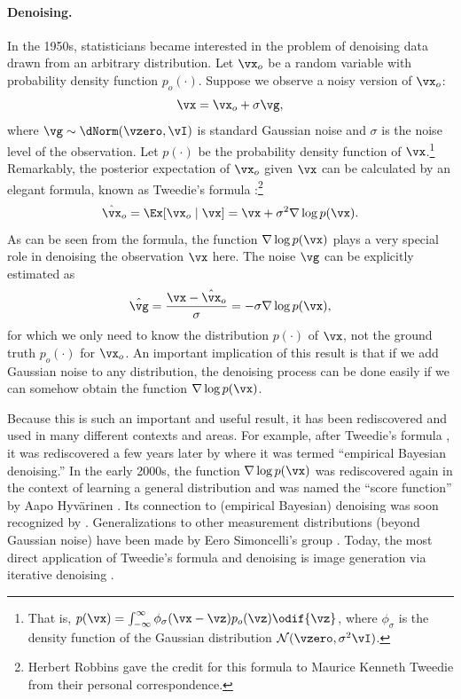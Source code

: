\documentclass[../../book-main.tex]{subfiles}
\begin{document}
\paragraph{Denoising.} In the 1950s, statisticians became interested
in the problem of denoising data drawn from an arbitrary
distribution. Let \(\vx_{o}\) be a random variable with probability
density function \(p_{o}(\cdot)\). Suppose we observe a noisy version
of \(\vx_{o}\):
\begin{equation}
    \vx = \vx_{o} + \sigma \vg,
\end{equation}
where \(\vg \sim \dNorm(\vzero, \vI)\) is standard Gaussian noise and
\(\sigma\) is the noise level of the observation. Let \(p(\cdot)\) be
the probability density function of \(\vx\).\footnote{That is,
    \(p(\vx) = \int_{-\infty}^{\infty} \phi_{\sigma}(\vx - \vz)p_{o}(\vz)
    \odif{\vz}\), where \(\phi_{\sigma}\) is the density function of the
Gaussian distribution \(\mathcal{N}(\vzero, \sigma^{2} \vI)\).}
Remarkably, the posterior expectation of \(\vx_{o}\) given \(\vx\)
can be calculated by an elegant formula, known as Tweedie's formula
\cite{Robbins1956AnEB}:\footnote{Herbert Robbins gave the credit for
this formula to Maurice Kenneth Tweedie from their personal correspondence.}
\begin{equation}
    \hat{\vx}_{o} = \Ex[\vx_{o}\mid \vx] = \vx + \sigma^{2} \nabla \log p(\vx).
\end{equation}
As can be seen from the formula, the function \(\nabla \log p(\vx)\)
plays a very special role in denoising the observation \(\vx\) here.
The noise \(\vg\) can be explicitly estimated as
\begin{equation}
    \hat{\vg} = \frac{\vx - \hat{\vx}_{o}}{\sigma} = -\sigma \nabla \log p(\vx),
\end{equation}
for which we only need to know the distribution \(p(\cdot)\) of
\(\vx\), not the ground truth \(p_{o}(\cdot)\) for \(\vx_{o}\). An
important implication of this result is that if we add Gaussian noise
to any distribution, the denoising process can be done easily if we
can somehow obtain the function \(\nabla \log p(\vx)\).

Because this is such an important and useful result, it has been
rediscovered and used in many different contexts and areas. For
example, after Tweedie's formula \cite{Robbins1956AnEB}, it was
rediscovered a few years later by \cite{Miyasawa61} where it was
termed ``empirical Bayesian denoising.'' In the early 2000s, the
function \(\nabla \log p(\vx)\) was rediscovered again in the context
of learning a general distribution and was named the ``score
function'' by Aapo Hyv\"{a}rinen \cite{hyvarinen05a}. Its connection
to (empirical Bayesian) denoising was soon recognized by \cite{Vincent2011}.
Generalizations to other measurement distributions (beyond Gaussian
noise) have been made by Eero Simoncelli's group \cite{Raphan10}.
Today, the most direct application of Tweedie's formula and denoising
is image generation via iterative denoising
\cite{Kadkhodaie21a,ho2020denoising}.
\end{document}
